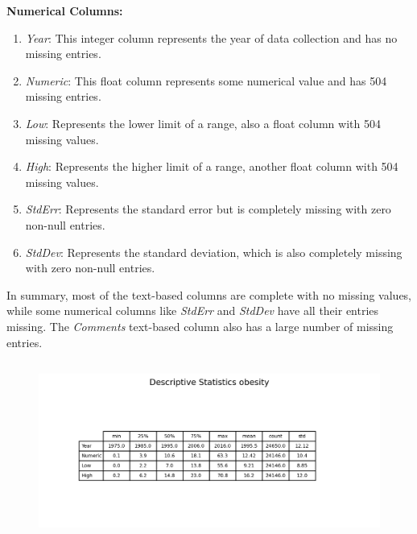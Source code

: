             \textbf{Numerical Columns:}
            \begin{enumerate}
                \item \textit{Year}: This integer column represents the year of data collection and has no missing entries.
                \item \textit{Numeric}: This float column represents some numerical value and has 504 missing entries.
                \item \textit{Low}: Represents the lower limit of a range, also a float column with 504 missing values.
                \item \textit{High}: Represents the higher limit of a range, another float column with 504 missing values.
                \item \textit{StdErr}: Represents the standard error but is completely missing with zero non-null entries.
                \item \textit{StdDev}: Represents the standard deviation, which is also completely missing with zero non-null entries.
            \end{enumerate}

            In summary, most of the text-based columns are complete with no missing values, while some numerical columns like \textit{StdErr} and \textit{StdDev} have all their entries missing. The \textit{Comments} text-based column also has a large number of missing entries.

        \subsection{\duExploreTheData}

            \begin{figure}[H]
                \centering
                \includegraphics[scale=1]{images/du_obesity_summary}
                \caption{}
                \label{fig:du-obesity-summary}
            \end{figure}

